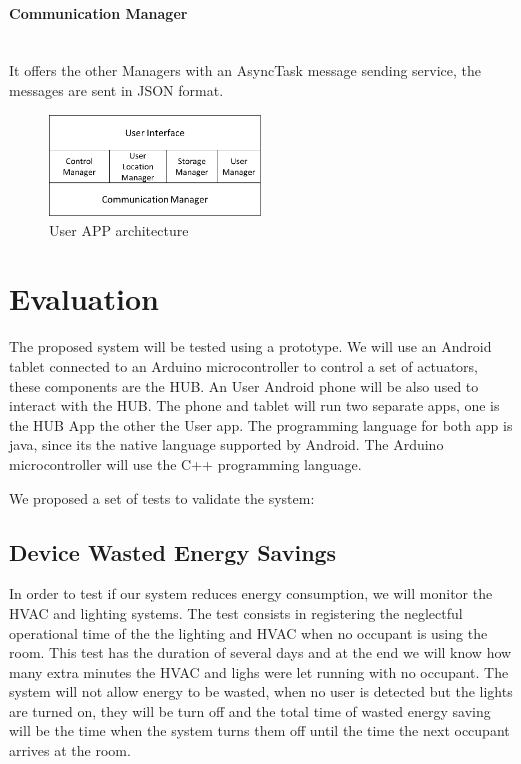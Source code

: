 \paragraph{Communication Manager}\mbox{}\\
It offers the other Managers with an AsyncTask message sending service, the messages are sent in JSON format.

\begin{figure}[h]
\centering
\includegraphics[width=0.5\textwidth]{Figures/software3}
\caption{User APP architecture }
\label{software3}
\end{figure}


\section{Evaluation} %

The proposed system will be tested using a prototype. We will use an Android tablet connected to an Arduino microcontroller to control a set of actuators, these components are the HUB. An User Android phone will be also used to interact with the HUB.
The phone and tablet will run two separate apps, one is the HUB App the other the User app. The programming language for both app is java, since its the native language supported by Android. The Arduino microcontroller will use the C++ programming language.


We proposed a set of tests to validate the system:

\subsection{Device Wasted Energy Savings}
In order to test if our system reduces energy consumption, we will monitor the HVAC and lighting systems.  The test consists in registering the neglectful operational time of the the lighting and HVAC when no occupant is using the room. This test has the duration of several days and at the end we will know how many extra minutes the HVAC and lighs were let running with no occupant. The system will not allow energy to be wasted, when no user is detected but the lights are turned on, they will be turn off and the total time of wasted energy saving will be the time when the system turns them off until the time the next occupant arrives at the room.

